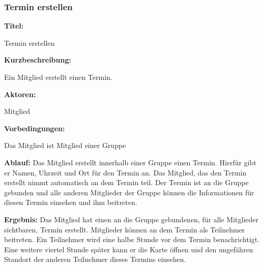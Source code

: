 \documentclass{scrartcl}
\begin{document}
	\subsubsection{Termin erstellen}
	\begin{description}
		\item \textbf{Titel:}
		\begin{description}
			\item Termin erstellen
		\end{description}
		\item \textbf{Kurzbeschreibung:}
		\begin{description}
			\item Ein Mitglied erstellt einen Termin.
		\end{description}
		\item \textbf{Aktoren:}
		\begin{description}
			\item \gls{Mitglied}
		\end{description}
		\item \textbf{Vorbedingungen:}
		\begin{description}
			\item Das Mitglied ist Mitglied einer Gruppe
		\end{description}
		\item \textbf{Ablauf:} \newline Das Mitglied erstellt innerhalb einer Gruppe einen Termin. Hierfür gibt er Namen, Uhrzeit und Ort für den Termin an. Das Mitglied, das den Termin erstellt nimmt automatisch an dem Termin teil. Der Termin ist an die Gruppe gebunden und alle anderen Mitglieder der Gruppe können die Informationen für diesen Termin einsehen und ihm beitreten.
		\item \textbf{Ergebnis:} \newline Das Mitglied hat einen an die Gruppe gebundenen, für alle Mitglieder sichtbaren, Termin erstellt. Mitglieder können an dem Termin als \gls{Teilnehmer} beitreten. Ein Teilnehmer wird eine halbe Stunde vor dem Termin benachrichtigt. Eine weitere viertel Stunde später kann er die Karte öffnen und den ungefähren Standort der anderen Teilnehmer dieses Termins einsehen.
	\end{description}
	
	\newpage
	
\end{document}
